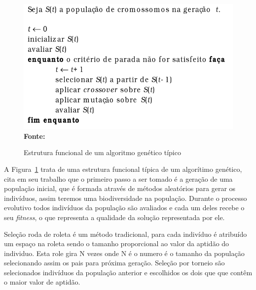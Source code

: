 \documentclass{abntpuc}
\begin{document}
\begin{figure}[!htb]
\caption[Estrutura funcional de um algoritmo genético típico]{Estrutura funcional de um algoritmo genético típico}
\label{fig:ag}
\centering
\includegraphics[scale=0.6]{imagens/ag.png}
\\ \textbf{\footnotesize Fonte: \cite{de1999introduccao}}
\end{figure}



A Figura~\ref{fig:ag} trata de uma estrutura funcional típica de um algorítimo genético, \cite{de1999introduccao} cita em seu trabalho que o primeiro passo a ser tomado é a geração de uma população inicial, que é formada através de métodos aleatórios para gerar os indivíduos, assim teremos uma biodiversidade na população. Durante o processo evolutivo todos indivíduos da população são avaliados e cada um deles recebe o seu \textit{fitness}, o que representa a qualidade da solução representada por ele.\par

Seleção roda de roleta é um método tradicional, para cada indivíduo é atribuído um espaço na roleta sendo o tamanho proporcional ao valor da aptidão do individuo. Esta role gira N vezes onde N é o numero é o tamanho da população selecionando assim os pais para próxima geração. Seleção por torneio são selecionados indivíduos da população anterior e escolhidos os dois que que contêm o maior valor de aptidão.\par
\end{document}
